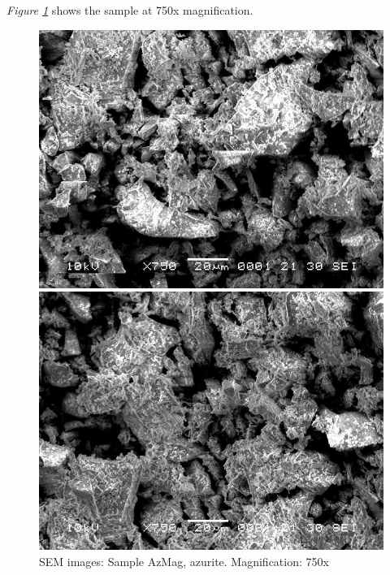 \textit{Figure \ref{fig:azmag_sem_2}} shows the sample at 750x magnification. 

\begin{figure}[H]
\centering
\begin{minipage}{.45\textwidth}
  \centering
  \includegraphics[width=\linewidth]{AzMag_x750_1_160321}
\end{minipage}
\begin{minipage}{.45\textwidth}
  \centering
  \includegraphics[width=\linewidth]{AzMag_x750_3_160321}
\end{minipage}
\caption[SEM images: Sample AzMag, azurite]{SEM images: Sample AzMag, azurite. Magnification: 750x}
\label{fig:azmag_sem_2}
\end{figure}

